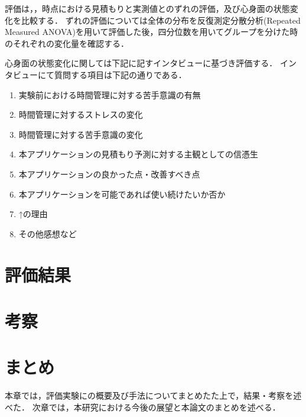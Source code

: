 評価は，，時点における見積もりと実測値とのずれの評価，及び心身面の状態変化を比較する．
ずれの評価については全体の分布を反復測定分散分析(Repeated Measured ANOVA)を用いて評価した後，四分位数を用いてグループを分けた時のそれぞれの変化量を確認する．

心身面の状態変化に関しては下記に記すインタビューに基づき評価する．
インタビューにて質問する項目は下記の通りである．%
\begin{enumerate}
  \item 実験前における時間管理に対する苦手意識の有無
  \item 時間管理に対するストレスの変化
  \item 時間管理に対する苦手意識の変化
  \item 本アプリケーションの見積もり予測に対する主観としての信憑生
  \item 本アプリケーションの良かった点・改善すべき点
  \item 本アプリケーションを可能であれば使い続けたいか否か
  \item ↑の理由
  \item その他感想など
\end{enumerate}

\section{評価結果}

\section{考察}

\section{まとめ}
本章では，評価実験にの概要及び手法についてまとめたた上で，結果・考察を述べた．
次章では，本研究における今後の展望と本論文のまとめを述べる．
